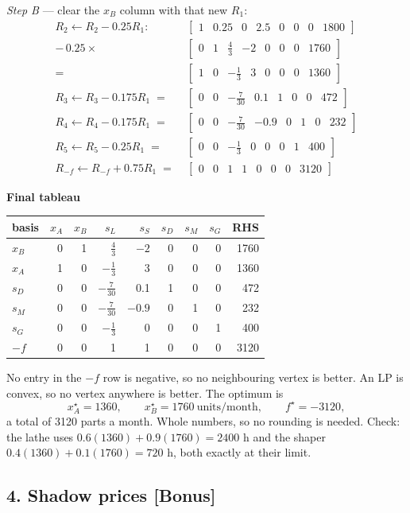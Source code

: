 \documentclass[11pt,a4paper]{article}
\newcommand{\rowv}[1]{\left[\begin{array}{VVVVVVV|V}#1\end{array}\right]}
\newenvironment{tableau}[1]
  {\begin{center}\begin{minipage}{\linewidth}\centering\small
   \textbf{#1}\\[0.4em]}
  {\end{minipage}\end{center}}
\begin{document}
\emph{Step B} --- clear the $x_B$ column with that new $R_1$:
\begin{align*}
  R_2 \leftarrow R_2 - 0.25R_1: \quad
  & \rowv{1 & 0.25 & 0 & 2.5 & 0 & 0 & 0 & 1800} \\
  -\,0.25\times & \rowv{0 & 1 & \tfrac{4}{3} & -2 & 0 & 0 & 0 & 1760} \\
  = & \rowv{1 & 0 & -\tfrac{1}{3} & 3 & 0 & 0 & 0 & 1360} \\
  R_3 \leftarrow R_3 - 0.175R_1 \;=\; & \rowv{0 & 0 & -\tfrac{7}{30} & 0.1 & 1 & 0 & 0 & 472} \\
  R_4 \leftarrow R_4 - 0.175R_1 \;=\; & \rowv{0 & 0 & -\tfrac{7}{30} & -0.9 & 0 & 1 & 0 & 232} \\
  R_5 \leftarrow R_5 - 0.25R_1 \;=\; & \rowv{0 & 0 & -\tfrac{1}{3} & 0 & 0 & 0 & 1 & 400} \\
  R_{-f} \leftarrow R_{-f} + 0.75R_1 \;=\; & \rowv{0 & 0 & 1 & 1 & 0 & 0 & 0 & 3120}
\end{align*}

\begin{tableau}{Final tableau}
\renewcommand{\arraystretch}{1.4}
\begin{tabular}{l|rrrrrrr|r}
basis & $x_A$ & $x_B$ & $s_L$ & $s_S$ & $s_D$ & $s_M$ & $s_G$ & RHS \\
\hline
$x_B$ & 0 & 1 & $\tfrac{4}{3}$   & $-2$   & 0 & 0 & 0 & 1760 \\
$x_A$ & 1 & 0 & $-\tfrac{1}{3}$  & 3      & 0 & 0 & 0 & 1360 \\
$s_D$ & 0 & 0 & $-\tfrac{7}{30}$ & 0.1    & 1 & 0 & 0 & 472 \\
$s_M$ & 0 & 0 & $-\tfrac{7}{30}$ & $-0.9$ & 0 & 1 & 0 & 232 \\
$s_G$ & 0 & 0 & $-\tfrac{1}{3}$  & 0      & 0 & 0 & 1 & 400 \\
\hline
$-f$  & 0 & 0 & 1 & 1 & 0 & 0 & 0 & 3120 \\
\end{tabular}
\end{tableau}

No entry in the $-f$ row is negative, so no neighbouring vertex is better. An LP
is convex, so no vertex anywhere is better. The optimum is
\[
  x_A^\star = 1360, \qquad x_B^\star = 1760 \ \text{units/month}, \qquad
  f^\star = -3120,
\]
a total of 3120 parts a month. Whole numbers, so no rounding is needed. Check:
the lathe uses $0.6(1360) + 0.9(1760) = 2400$ h and the shaper
$0.4(1360) + 0.1(1760) = 720$ h, both exactly at their limit.

\subsection*{4. Shadow prices [Bonus]}
\end{document}
